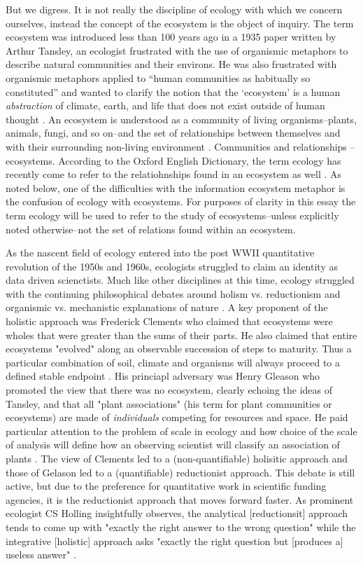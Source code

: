 But we digress. It is not really the discipline of ecology with which we concern ourselves, instead the concept of the ecosystem is the object of inquiry. The term ecosystem was introduced less than 100 years ago in a 1935 paper written by Arthur Tansley, an ecologist frustrated with the use of organismic metaphors to describe natural communities and their environs. He was also frustrated with organismic metaphors applied to “human communities as habitually so constituted” and wanted to clarify the notion that the ‘ecosystem’ is a human \textit{abstraction} of climate, earth, and life that does not exist outside of human thought \cite{tansley_1935}. An ecosystem is understood as a community of living organisms–plants, animals, fungi, and so on–and the set of relationships between themselves and with their surrounding non-living environment \cite{tansley_1935, odum_1953}. Communities and relationships – ecosystems. According to the Oxford English Dictionary, the term ecology has recently come to refer to the relatiohnships found in an ecosystem as well \cite{oed_2008}. As noted below, one of the difficulties with the information ecosystem metaphor is the confusion of ecology with ecosystems. For purposes of clarity in this essay the term ecology will be used to refer to the study of ecosystems--unless explicitly noted otherwise--not the set of relations found within an ecosystem. 

As the nascent field of ecology entered into the post WWII quantitative revolution of the 1950s and 1960s, ecologists struggled to claim an identity as data driven scienctists. Much like other disciplines at this time, ecology struggled with the continuing philosophical debates around holism vs. reductionism and organismic vs. mechanistic explanations of nature \cite{barbour_1996}. A key proponent of the holistic approach was Frederick Clements who claimed that ecosystems were wholes that were greater than the sums of their parts. He also claimed that entire ecosystems "evolved" along an observable succession of steps to maturity. Thus a particular combination of soil, climate and organisms will always proceed to a defined stable endpoint \cite{clements_1936}. His princiapl adversary was Henry Gleason who promoted the view that there was no ecosystem, clearly echoing the ideas of Tansley, and that all "plant associations" (his term for plant communities or ecosystems) are made of \textit{individuals} competing for resources and space. He paid particular attention to the problem of scale in ecology and how choice of the scale of analysis will define how an observing scientist will classify an association of plants \cite{gleason_1939}. The view of Clements led to a (non-quantifiable) holisitic approach and those of Gelason led to a (quantifiable) reductionist approach. This debate is still active, but due to the preference for quantitative work in scientific funding agencies, it is the reductionist approach that moves forward faster. As prominent ecologist CS Holling insightfully observes, the analytical [reductionsit] approach tends to come up with "exactly the right answer to the wrong question" while the integrative [holistic] approach asks "exactly the right question but [produces a] useless answer" \cite[][p. 3]{holling_1998}.

